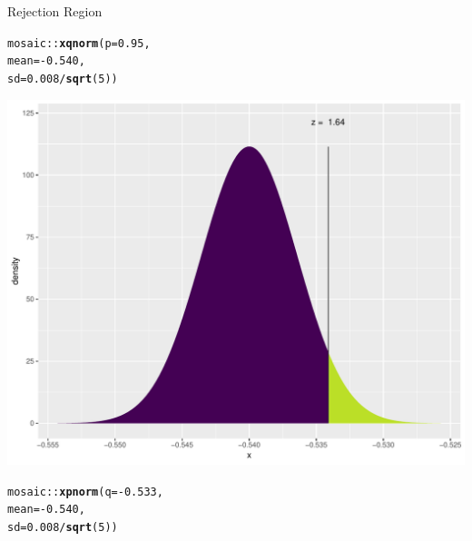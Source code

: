 \documentclass{beamer}\usepackage[]{graphicx}\usepackage[]{color}
\newcommand{\hlnum}[1]{\textcolor[rgb]{0.686,0.059,0.569}{#1}}%
\newcommand{\hlopt}[1]{\textcolor[rgb]{0,0,0}{#1}}%
\newcommand{\hlstd}[1]{\textcolor[rgb]{0.345,0.345,0.345}{#1}}%
\newcommand{\hlkwc}[1]{\textcolor[rgb]{0.333,0.667,0.333}{#1}}%
\newcommand{\hlkwd}[1]{\textcolor[rgb]{0.737,0.353,0.396}{\textbf{#1}}}%
\newenvironment{knitrout}{}{} %
\begin{document}
\begin{frame}[fragile]{Rejection Region}


	\begin{minipage}{0.47\textwidth}
\begin{knitrout}\scriptsize
{}\color{fgcolor}
\begin{alltt}
\hlstd{mosaic}\hlopt{::}\hlkwd{xqnorm}\hlstd{(}\hlkwc{p} \hlstd{=} \hlnum{0.95}\hlstd{,}
\hlkwc{mean} \hlstd{=} \hlopt{-}\hlnum{0.540}\hlstd{,}
\hlkwc{sd} \hlstd{=} \hlnum{0.008}\hlopt{/}\hlkwd{sqrt}\hlstd{(}\hlnum{5}\hlstd{))}
\end{alltt}


{\centering \includegraphics[width=1\linewidth]{figure/unnamed-chunk-4-1} 

}



\end{knitrout}
	\end{minipage}
	\begin{minipage}{0.47\textwidth}
\begin{knitrout}\scriptsize
{}\color{fgcolor}
\begin{alltt}
\hlstd{mosaic}\hlopt{::}\hlkwd{xpnorm}\hlstd{(}\hlkwc{q} \hlstd{=} \hlopt{-}\hlnum{0.533}\hlstd{,}
\hlkwc{mean} \hlstd{=} \hlopt{-}\hlnum{0.540}\hlstd{,}
\hlkwc{sd} \hlstd{=} \hlnum{0.008}\hlopt{/}\hlkwd{sqrt}\hlstd{(}\hlnum{5}\hlstd{))}
\end{alltt}



\end{knitrout}
\end{minipage}
\end{frame}
\end{document}
